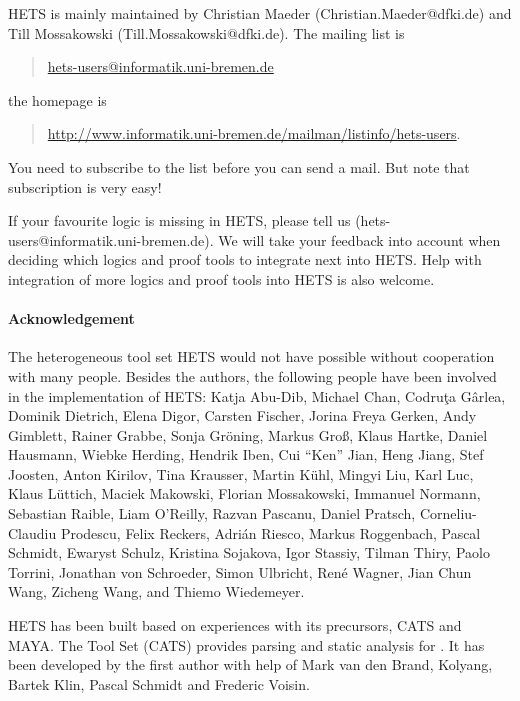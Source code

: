 \documentclass{article}
\newcommand{\normalTEXTSC}[2]{{#1\scriptsize#2}}
\newcommand     {\MAYA}{\normalTEXTSC{M}{AYA}\xspace}
\newcommand     {\Hets}{\normalTEXTSC{H}{ETS}\xspace}
\newcommand     {\Cats}{\normalTEXTSC{C}{ATS}\xspace}
\begin{document}
\Hets is mainly maintained by
Christian Maeder (Christian.Maeder@dfki.de) and Till Mossakowski
(Till.Mossakowski@dfki.de). The mailing list is
\begin{quote}
 \url{hets-users@informatik.uni-bremen.de}
\end{quote}
the homepage is
\begin{quote}
\url{http://www.informatik.uni-bremen.de/mailman/listinfo/hets-users}.
\end{quote}

You need to subscribe to the list before you can send a mail.
But note that subscription is very easy!

If your favourite logic is missing in \Hets, please tell us
(hets-users@informatik.uni-bremen.de). We will take your feedback into account
when deciding which logics and proof tools to integrate next into \Hets. Help
with integration of more logics and proof tools into \Hets is also welcome.

\paragraph{Acknowledgement}
The heterogeneous tool set \Hets would not have possible
without cooperation with many people.
Besides the authors, the following people have been involved
in the implementation of \Hets:
Katja Abu-Dib,
Michael Chan,
Codru\c ta G\^ arlea,
Dominik Dietrich,
Elena Digor,
Carsten Fischer,
Jorina Freya Gerken,
Andy Gimblett,
Rainer Grabbe,
Sonja Gr\"{o}ning,
Markus Groß,
Klaus Hartke,
Daniel Hausmann,
Wiebke Herding,
Hendrik Iben,
Cui ``Ken'' Jian,
Heng Jiang,
Stef Joosten,
Anton Kirilov,
Tina Krausser,
Martin K\"{u}hl,
Mingyi Liu,
Karl Luc,
Klaus L\"{u}ttich,
Maciek Makowski,
Florian Mossakowski,
Immanuel Normann,
Sebastian Raible,
Liam O'Reilly,
Razvan Pascanu,
Daniel Pratsch,
Corneliu-Claudiu Prodescu,
Felix Reckers,
Adri\'{a}n Riesco,
Markus Roggenbach,
Pascal Schmidt,
Ewaryst Schulz,
Kristina Sojakova,
Igor Stassiy,
Tilman Thiry,
Paolo Torrini,
Jonathan von Schroeder,
Simon Ulbricht,
Ren\'{e} Wagner,
Jian Chun Wang,
Zicheng Wang, and
Thiemo Wiedemeyer.

\Hets has been built based on experiences with its
precursors,
                \index{Cats@\Cats}%
\Cats and
                \index{Maya@\MAYA}%
\MAYA.
The \CASL Tool Set (\Cats)
\cite{Mossakowski:2000:CST,Mossakowski:1998:SSA}
provides parsing and static analysis for \CASL.
It has been developed by the first author with help
of Mark van den Brand, Kolyang, Bartek Klin, Pascal Schmidt and
Frederic Voisin.
\end{document}
